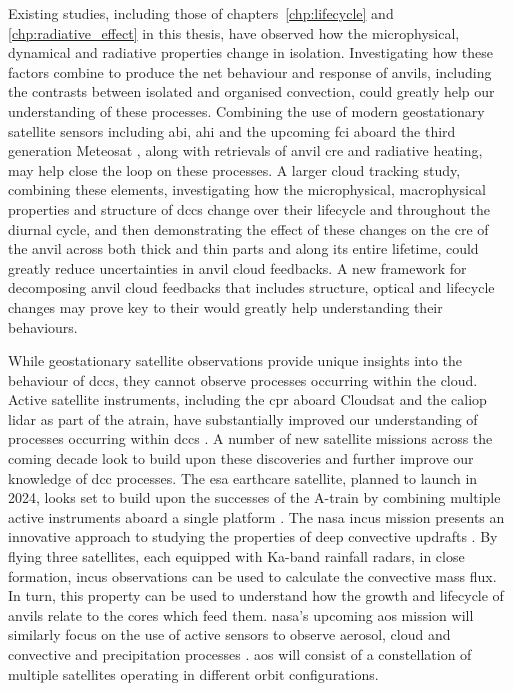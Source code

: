 Existing studies, including those of chapters~\ref{chp:lifecycle} and \ref{chp:radiative_effect} in this thesis, have observed how the microphysical, dynamical and radiative properties change in isolation.
Investigating how these factors combine to produce the net behaviour and response of anvils, including the contrasts between isolated and organised convection, could greatly help our understanding of these processes.
Combining the use of modern geostationary satellite sensors including \acrshort{abi}, \acrlong{ahi} and the upcoming \acrlong{fci} aboard the third generation Meteosat \citep{durand_flexible_2015}, along with retrievals of anvil \acrshort{cre} and radiative heating, may help close the loop on these processes.
A larger cloud tracking study, combining these elements, investigating how the microphysical, macrophysical properties and structure of \acrshort{dcc}s change over their lifecycle and throughout the diurnal cycle, and then demonstrating the effect of these changes on the \acrshort{cre} of the anvil across both thick and thin parts and along its entire lifetime, could greatly reduce uncertainties in anvil cloud feedbacks.
A new framework for decomposing anvil cloud feedbacks that includes structure, optical and lifecycle changes may prove key to their would greatly help understanding their behaviours.

While geostationary satellite observations provide unique insights into the behaviour of \acrshort{dcc}s, they cannot observe processes occurring within the cloud.
Active satellite instruments, including the \acrshort{cpr} aboard Cloudsat and the \acrlong{caliop} lidar as part of the \acrfull{atrain}, have substantially improved our understanding of processes occurring within \acrshort{dcc}s \citep{stephens_cloudsat_2018}.
A number of new satellite missions across the coming decade look to build upon these discoveries and further improve our knowledge of \acrshort{dcc} processes.
The \acrshort{esa} \acrfull{earthcare} satellite, planned to launch in 2024, looks set to build upon the successes of the A-train by combining multiple active instruments aboard a single platform \citep{wehr_earthcare_2023}.
The \acrshort{nasa} \acrfull{incus} mission presents an innovative approach to studying the properties of deep convective updrafts \citep{vandenheever_tropical_2023}.
By flying three satellites, each equipped with Ka-band rainfall radars, in close formation, \acrshort{incus} observations can be used to calculate the convective mass flux.
In turn, this property can be used to understand how the growth and lifecycle of anvils relate to the cores which feed them.
\acrshort{nasa}'s upcoming \acrfull{aos} mission will similarly focus on the use of active sensors to observe aerosol, cloud and convective and precipitation processes \citep{braun_nasa_2023}.
\acrshort{aos} will consist of a constellation of multiple satellites operating in different orbit configurations.

